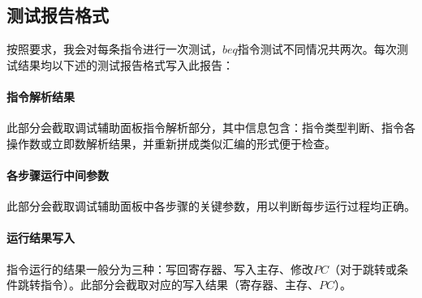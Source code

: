 \documentclass[main.tex]{subfiles}
\begin{document}
\subsection{测试报告格式}
按照要求，我会对每条指令进行一次测试，$beq$指令测试不同情况共两次。每次测试结果均以下述的测试报告格式写入此报告：

\paragraph{指令解析结果}
此部分会截取调试辅助面板指令解析部分，其中信息包含：指令类型判断、指令各操作数或立即数解析结果，并重新拼成类似汇编的形式便于检查。

\paragraph{各步骤运行中间参数}
此部分会截取调试辅助面板中各步骤的关键参数，用以判断每步运行过程均正确。

\paragraph{运行结果写入}
指令运行的结果一般分为三种：写回寄存器、写入主存、修改$PC$（对于跳转或条件跳转指令）。此部分会截取对应的写入结果（寄存器、主存、$PC$）。

\clearpage
\end{document}
